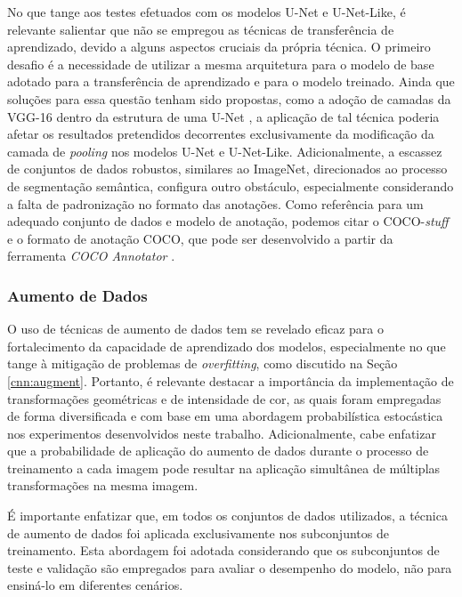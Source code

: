 No que tange aos testes efetuados com os modelos U-Net e U-Net-Like, é relevante salientar que não se empregou as técnicas de transferência de aprendizado, devido a alguns aspectos cruciais da própria técnica. O primeiro desafio é a necessidade de utilizar a mesma arquitetura para o modelo de base adotado para a transferência de aprendizado e para o modelo treinado. Ainda que soluções para essa questão tenham sido propostas, como a adoção de camadas da VGG-16 dentro da estrutura de uma U-Net \citep{Pravitasari2020UNet-VGG16Segmentation}, a aplicação de tal técnica poderia afetar os resultados pretendidos decorrentes exclusivamente da modificação da camada de \textit{pooling} nos modelos U-Net e U-Net-Like. Adicionalmente, a escassez de conjuntos de dados robustos, similares ao ImageNet, direcionados ao processo de segmentação semântica, configura outro obstáculo, especialmente considerando a falta de padronização no formato das anotações. Como referência para um adequado conjunto de dados e modelo de anotação, podemos citar o COCO-\textit{stuff} \citep{Caesar2016} e o formato de anotação COCO, que pode ser desenvolvido a partir da ferramenta \textit{COCO Annotator} \citep{Brooks2019COCOAnnotator}.


\subsubsection{Aumento de Dados}
\label{project:augment}
O uso de técnicas de aumento de dados tem se revelado eficaz para o fortalecimento da capacidade de aprendizado dos modelos, especialmente no que tange à mitigação de problemas de \textit{overfitting}, como discutido na Seção \ref{cnn:augment}. Portanto, é relevante destacar a importância da implementação de transformações geométricas e de intensidade de cor, as quais foram empregadas de forma diversificada e com base em uma abordagem probabilística estocástica nos experimentos desenvolvidos neste trabalho. Adicionalmente, cabe enfatizar que a probabilidade de aplicação do aumento de dados durante o processo de treinamento a cada imagem pode resultar na aplicação simultânea de múltiplas transformações na mesma imagem.

É importante enfatizar que, em todos os conjuntos de dados utilizados, a técnica de aumento de dados foi aplicada exclusivamente nos subconjuntos de treinamento. Esta abordagem foi adotada considerando que os subconjuntos de teste e validação são empregados para avaliar o desempenho do modelo, não para ensiná-lo em diferentes cenários.

